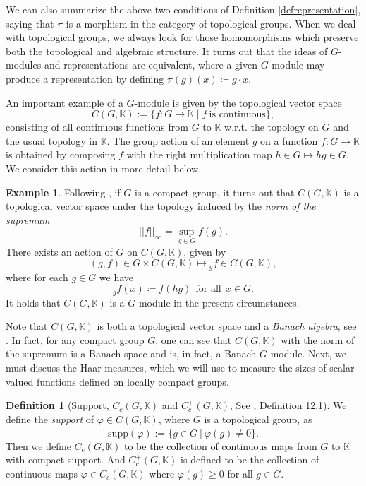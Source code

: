 \documentclass{amsart}
\theoremstyle{definition}
\newtheorem{definition}[theorem]{Definition}
\newtheorem{example}[theorem]{Example}
\numberwithin{equation}{section}
\newcommand{\cgk}{C(G,\mathbb{K})}
\newcommand{\K}{\mathbb{K}}
\newcommand{\supp}{\text{supp}}
\begin{document}
We can also summarize the above two conditions of Definition \ref{defrepresentation}, saying that $\pi$ is a morphism in the category of topological groups. When we deal with topological groups, we always look for those homomorphisms which preserve both the topological and algebraic structure. It turns out that the ideas of $G$-modules and representations are equivalent, where a given $G$-module may produce a representation by defining $\pi(g)(x)\coloneqq g\cdot x$.

An important example of a $G$-module is given by the topological vector space $$\cgk :=\{ f : G \to \K \mid f \ \mbox{is continuous}\},$$ consisting of all continuous functions from $G$ to $\K$ w.r.t. the topology on $G$ and the usual topology in $\K$. The group action of an element $g$ on a function $f:G\rightarrow\K$ is obtained by composing $f$ with the right multiplication map $h\in G\mapsto hg\in G$. We consider this action in more detail below.

\begin{example}\label{supnorm} Following \cite{HewittRoss, hilgertneeb, hofmann, stroppel}, if $G$ is a compact group, it turns out that $\cgk$ is a topological vector space under the topology induced by the \textit{norm of the supremum}
\[
||f||_\infty=\sup_{g\in G}f(g).
\]
There exists an action of $G$ on $\cgk$, given by
$$ (g,f)\in G\times\cgk\mapsto {}_gf \in \cgk,$$
where for each $g\in G$ we have \[_gf(x)\coloneqq f(hg) \ \ \mbox{for all} \ \  x\in G.\] It holds that $\cgk$ is a $G$-module in the present circumstances.
\end{example}



Note that $\cgk$ is both a topological vector space and a \textit{Banach algebra}, see \cite[Chapter 1]{hofmann}.   In fact, for any compact group $G$, one can see that $\cgk$ with the norm of the supremum is a Banach space and is, in fact, a Banach $G$-module.   Next, we must discuss the Haar measures, which we will use to measure the sizes of scalar-valued functions defined on locally compact groups. 

\begin{definition}[Support, $C_c(G,\K)$ and $C_c^+(G,\K)$, See \cite{stroppel}, Definition 12.1]\label{closedsupport}
We define the \textit{support} of $\varphi \in C(G,\mathbb{K})$, where $G$ is a topological group, as $$\supp (\varphi) := \overline{\{g \in G \ | \ \varphi(g) \neq 0\}}.$$ Then we define
 $C_c(G,\K)$ to be the collection of continuous maps from $G$ to $\K$ with compact support. 
 And $C_c^+(G,\K)$ is defined to be the collection of continuous maps $\varphi\in C_c(G,\K)$ where $\varphi(g)\geq 0$ for all $g\in G$.
\end{definition}
\end{document}
